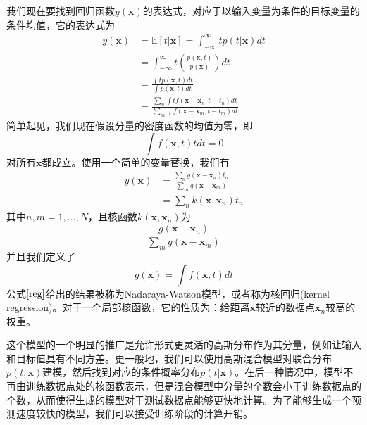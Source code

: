 我们现在要找到回归函数$y(\boldsymbol{x})$的表达式，对应于以输入变量为条件的目标变量的条件均值，它的表达式为
\begin{equation}
\begin{aligned}
	y(\boldsymbol{x})&=\mathbb{E}[t|\boldsymbol{x}]=\int_{-\infty}^{\infty}tp(t|\boldsymbol{x})dt\\
	&=\int _{-\infty}^{\infty} t\left(\frac{p(\boldsymbol{x},t)}{p(\boldsymbol{x})} \right)dt\\
	&=\frac{\int tp(\boldsymbol{x},t)dt}{\int p(\boldsymbol{x},t)dt}\\
	&=\frac{\sum_{n}\int tf(\boldsymbol{x}-\boldsymbol{x}_n,t-t_n)dt }{\sum_{m}\int f(\boldsymbol{x}-\boldsymbol{x}_m,t-t_m)dt}
\end{aligned}
\end{equation}
简单起见，我们现在假设分量的密度函数的均值为零，即
\begin{equation}
	\int f(\boldsymbol{x},t)tdt=0
\end{equation}
对所有$\boldsymbol{x}$都成立。使用一个简单的变量替换，我们有
\begin{equation}
\label{reg}
\begin{aligned}
	y(\boldsymbol{x})&=\frac{\sum_n g(\boldsymbol{x}-\boldsymbol{x}_n)t_n}{\sum_m g(\boldsymbol{x}-\boldsymbol{x}_m)}\\
	&=\sum_nk(\boldsymbol{x},\boldsymbol{x}_n)t_n
\end{aligned}
\end{equation}
其中$n,m=1,\dots,N$，且核函数$k(\boldsymbol{x},\boldsymbol{x}_n)$为
\begin{equation}
	\frac{ g(\boldsymbol{x}-\boldsymbol{x}_n)}{\sum_m g(\boldsymbol{x}-\boldsymbol{x}_m)}
\end{equation}
并且我们定义了
\begin{equation}
	g(\boldsymbol{x})=\int f(\boldsymbol{x},t)dt
\end{equation}
公式$\ref{reg}$给出的结果被称为Nadaraya-Watson模型，或者称为核回归(kernel regression)。对于一个局部核函数，它的性质为：给距离$\boldsymbol{x}$较近的数据点$\boldsymbol{x}_n$较高的权重。

这个模型的一个明显的推广是允许形式更灵活的高斯分布作为其分量，例如让输入和目标值具有不同方差。更一般地，我们可以使用高斯混合模型对联合分布$p(t,\boldsymbol{x})$建模，然后找到对应的条件概率分布$p(t|\boldsymbol{x})$。在后一种情况中，模型不再由训练数据点处的核函数表示，但是混合模型中分量的个数会小于训练数据点的个数，从而使得生成的模型对于测试数据点能够更快地计算。为了能够生成一个预测速度较快的模型，我们可以接受训练阶段的计算开销。

